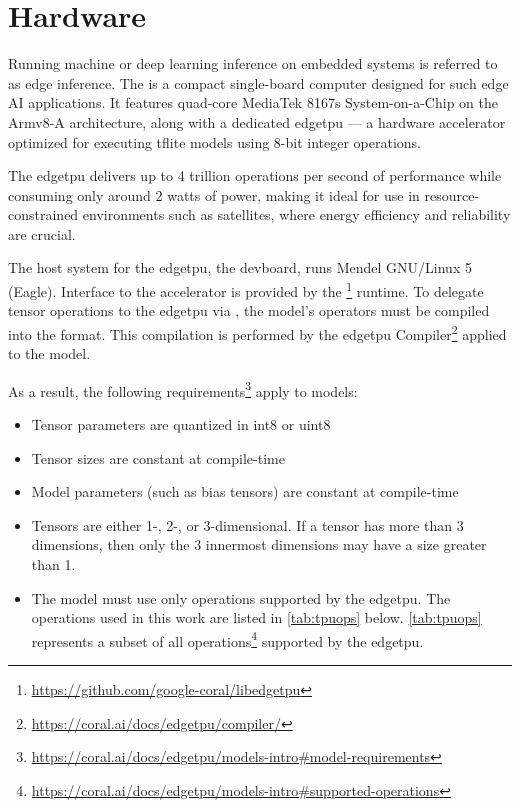 {\section{Hardware}
\label{subsec:hardware}

Running machine or deep learning inference on embedded systems is referred to as edge inference.
The  is a compact single-board computer designed for such edge AI applications.
It features quad-core MediaTek 8167s System-on-a-Chip on the Armv8-A architecture,
along with a dedicated \gls{edgetpu} --- a hardware accelerator optimized for executing \gls{tflite} models using 8-bit integer operations.

The \gls{edgetpu} delivers up to 4 trillion operations per second of performance while consuming only around 2 watts of power,
making it ideal for use in resource-constrained environments such as satellites, where energy efficiency and reliability are crucial.

The host system for the \gls{edgetpu}, the \gls{devboard}, runs Mendel GNU/Linux 5 (Eagle).
Interface to the accelerator is provided by the \footnote{\url{https://github.com/google-coral/libedgetpu}} runtime.
To delegate tensor operations to the \gls{edgetpu} via , the model's operators must be compiled into the  format.
This compilation is performed by the \gls{edgetpu} Compiler\footnote{\url{https://coral.ai/docs/edgetpu/compiler/}} applied to the model.

As a result, the following requirements\footnote{\url{https://coral.ai/docs/edgetpu/models-intro\#model-requirements}} apply to models:

\begin{itemize}
    \item Tensor parameters are quantized in \gls{int8} or \gls{uint8}
    \item Tensor sizes are constant at compile-time
    \item Model parameters (such as bias tensors) are constant at compile-time
    \item Tensors are either 1-, 2-, or 3-dimensional. If a tensor has more than 3 dimensions, then only the 3 innermost dimensions may have a size greater than 1.
    \item The model must use only operations supported by the \gls{edgetpu}. The operations used in this work are listed in \autoref{tab:tpuops} below.
    \autoref{tab:tpuops} represents a subset of all operations\footnote{\url{https://coral.ai/docs/edgetpu/models-intro\#supported-operations}} supported by the \gls{edgetpu}.
\end{itemize}

}
